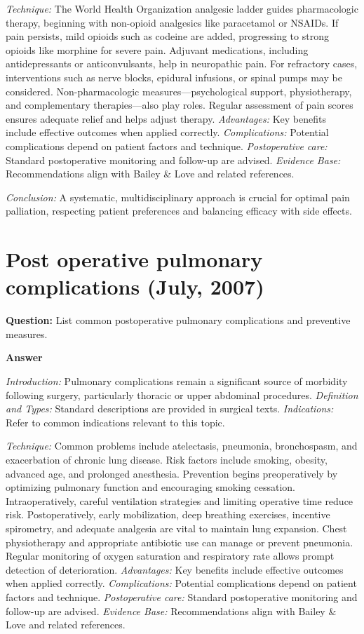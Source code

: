 \documentclass{article}
\begin{document}
\emph{Technique:} The World Health Organization analgesic ladder guides pharmacologic therapy, beginning with non-opioid analgesics like paracetamol or NSAIDs. If pain persists, mild opioids such as codeine are added, progressing to strong opioids like morphine for severe pain. Adjuvant medications, including antidepressants or anticonvulsants, help in neuropathic pain. For refractory cases, interventions such as nerve blocks, epidural infusions, or spinal pumps may be considered. Non-pharmacologic measures—psychological support, physiotherapy, and complementary therapies—also play roles. Regular assessment of pain scores ensures adequate relief and helps adjust therapy.
\emph{Advantages:} Key benefits include effective outcomes when applied correctly.
\emph{Complications:} Potential complications depend on patient factors and technique.
\emph{Postoperative care:} Standard postoperative monitoring and follow-up are advised.
\emph{Evidence Base:} Recommendations align with Bailey \& Love and related references.

\emph{Conclusion:} A systematic, multidisciplinary approach is crucial for optimal pain palliation, respecting patient preferences and balancing efficacy with side effects.


\section{Post operative pulmonary complications (July, 2007)}

\textbf{Question:} List common postoperative pulmonary complications and preventive measures.

\textbf{Answer}

\emph{Introduction:} Pulmonary complications remain a significant source of morbidity following surgery, particularly thoracic or upper abdominal procedures.
\emph{Definition and Types:} Standard descriptions are provided in surgical texts.
\emph{Indications:} Refer to common indications relevant to this topic.

\emph{Technique:} Common problems include atelectasis, pneumonia, bronchospasm, and exacerbation of chronic lung disease. Risk factors include smoking, obesity, advanced age, and prolonged anesthesia. Prevention begins preoperatively by optimizing pulmonary function and encouraging smoking cessation. Intraoperatively, careful ventilation strategies and limiting operative time reduce risk. Postoperatively, early mobilization, deep breathing exercises, incentive spirometry, and adequate analgesia are vital to maintain lung expansion. Chest physiotherapy and appropriate antibiotic use can manage or prevent pneumonia. Regular monitoring of oxygen saturation and respiratory rate allows prompt detection of deterioration.
\emph{Advantages:} Key benefits include effective outcomes when applied correctly.
\emph{Complications:} Potential complications depend on patient factors and technique.
\emph{Postoperative care:} Standard postoperative monitoring and follow-up are advised.
\emph{Evidence Base:} Recommendations align with Bailey \& Love and related references.
\end{document}
